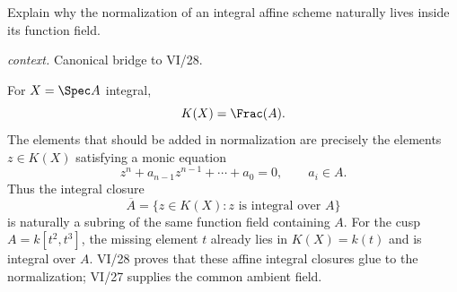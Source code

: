 \begin{problem}\label{prob:vi27-p20}
Explain why the normalization of an integral affine scheme naturally lives inside its function field.
\par\smallskip\noindent\textit{context.} Canonical bridge to VI/28.
\end{problem}

\ifdefined\FullProblemDossiers
\begin{solution}
For \(X=\Spec A\) integral,
\[
K(X)=\Frac(A).
\]
The elements that should be added in normalization are precisely the elements \(z\in K(X)\) satisfying a monic
equation
\[
z^n+a_{n-1}z^{n-1}+\cdots+a_0=0,\qquad a_i\in A.
\]
Thus the integral closure
\[
\overline A=\{z\in K(X):z\text{ is integral over }A\}
\]
is naturally a subring of the same function field containing \(A\). For the cusp \(A=k[t^2,t^3]\), the missing
element \(t\) already lies in \(K(X)=k(t)\) and is integral over \(A\). VI/28 proves that these affine integral
closures glue to the normalization; VI/27 supplies the common ambient field.
\end{solution}
\fi
